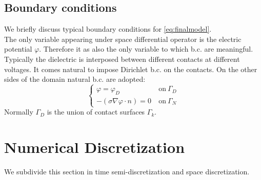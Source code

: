 \documentclass[11pt,a4paper]{article}
\begin{document}
\subsection{Boundary conditions}
We briefly discuss typical boundary conditions for \eqref{eq:finalmodel}.\\
The only variable appearing under space differential operator is the electric potential \(\varphi\). Therefore it as also the only variable to which b.c. are meaningful. Typically the dielectric is interposed between different contacts at different voltages. It comes natural to impose Dirichlet b.c. on the contacts. On the other sides of the domain natural b.c. are adopted:
\begin{equation}\label{eq:LEVEL1Bc}
	\left\{\begin{aligned}
		\left.\varphi\right. = \varphi_D\ &\ \mathrm{on}\ \Gamma_D\\[3mm]
		-\left.\left(\sigma \nabla  \varphi \cdot n\right) = 0\right. &\ \mathrm{on}\ \Gamma_N
	\end{aligned}\right.
\end{equation}
Normally \(\Gamma_D\) is the union of contact surfaces \(\Gamma_k\).

\section{Numerical Discretization}
We subdivide this section in time semi-discretization and space discretization.
\end{document}
